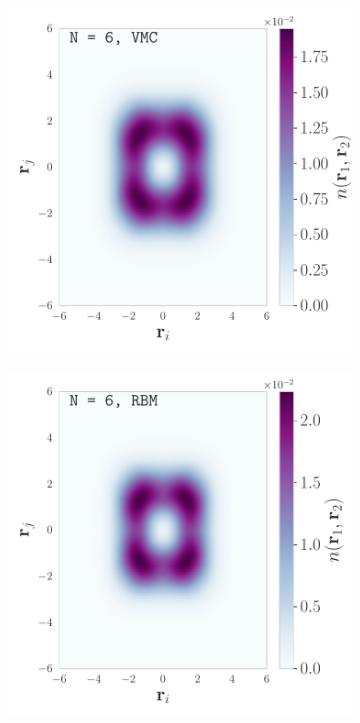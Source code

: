 \begin{figure}[H]
    \centering
    \begin{subfigure}[t]{0.32\textwidth}
        \centering
        \includegraphics[width=\textwidth]{Chapters/Results/dots/two_body_density_N[6]_nqs_VMC_0.5.pdf}
        \hspace{-1cm}
    \end{subfigure}
    \begin{subfigure}[t]{0.32\textwidth}
        \centering
        \includegraphics[width=\textwidth]{Chapters/Results/dots/two_body_density_N[6]_nqs_RBM_0.5.pdf}


\end{subfigure}
\end{figure}
